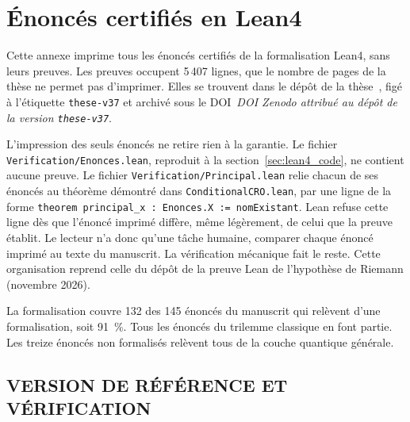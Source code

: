 
\chapter{\'Enonc\'es certifi\'es en Lean4}
\label{chap:annexe_lean4}

\providecommand{\DOIdepot}{\textit{DOI Zenodo attribu\'e au d\'ep\^ot de la version \texttt{these-v37}}}

\begin{sloppypar}
Cette annexe imprime tous les \'enonc\'es certifi\'es de la formalisation Lean4, sans leurs
preuves. Les preuves occupent 5\,407 lignes, que le nombre de pages de la th\`ese ne permet
pas d'imprimer. Elles se trouvent dans le d\'ep\^ot de la th\`ese~\cite{CROTrilemmaDepot},
fig\'e \`a l'\'etiquette \texttt{these-v37} et archiv\'e sous le DOI~\DOIdepot.

L'impression des seuls \'enonc\'es ne retire rien \`a la garantie. Le fichier
\texttt{Verification/Enonces.lean}, reproduit \`a la section~\ref{sec:lean4_code}, ne
contient aucune preuve. Le fichier \texttt{Verification/Principal.lean} relie chacun de ses
\'enonc\'es au th\'eor\`eme d\'emontr\'e dans \texttt{ConditionalCRO.lean}, par une ligne de la
forme \texttt{theorem principal\_x : Enonces.X := nomExistant}. Lean refuse cette ligne d\`es
que l'\'enonc\'e imprim\'e diff\`ere, m\^eme l\'eg\`erement, de celui que la preuve \'etablit.
Le lecteur n'a donc qu'une t\^ache humaine, comparer chaque \'enonc\'e imprim\'e au texte du
manuscrit. La v\'erification m\'ecanique fait le reste. Cette organisation reprend celle du
d\'ep\^ot de la preuve Lean de l'hypoth\`ese de Riemann (novembre 2026).

La formalisation couvre 132 des 145 \'enonc\'es du manuscrit qui rel\`event d'une
formalisation, soit 91~\%. Tous les \'enonc\'es du trilemme classique en font partie. Les
treize \'enonc\'es non formalis\'es rel\`event tous de la couche quantique g\'en\'erale.
\end{sloppypar}

\section{VERSION DE R\'EF\'ERENCE ET V\'ERIFICATION}
\label{sec:lean4_reproduction}

